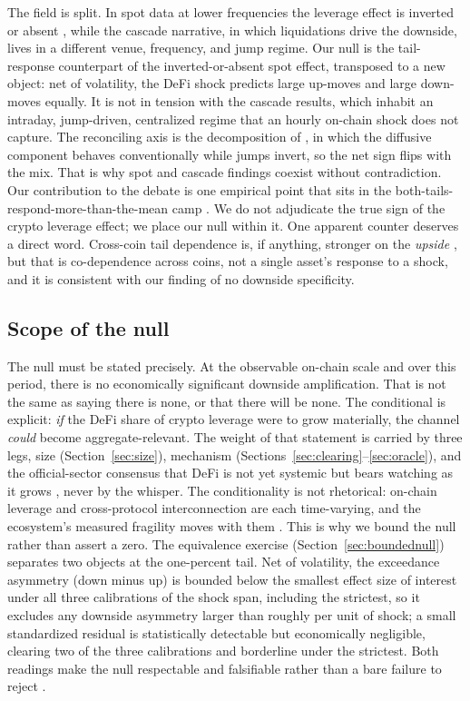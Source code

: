 The field is split. In spot data at lower frequencies the leverage effect
is inverted or absent \citep{baur2018,aharon2023}, while the cascade
narrative, in which liquidations drive the downside, lives in a different
venue, frequency, and jump regime. Our null is the tail-response counterpart
of the inverted-or-absent spot effect, transposed to a new object: net of
volatility, the DeFi shock predicts large up-moves and large down-moves
equally. It is not in tension with the cascade results, which inhabit an
intraday, jump-driven, centralized regime that an hourly on-chain shock does
not capture. The reconciling axis is the decomposition of \citet{huang2022},
in which the diffusive component behaves conventionally while jumps invert, so
the net sign flips with the mix. That is why spot and cascade findings coexist
without contradiction. Our contribution to the debate is one empirical
point that sits in the both-tails-respond-more-than-the-mean camp
\citep{ando2022}. We do not adjudicate the true sign of the crypto leverage
effect; we place our null within it. One apparent counter deserves a direct
word. Cross-coin tail dependence is, if anything, stronger on the
\emph{upside} \citep{nguyen2020}, but that is co-dependence across coins, not
a single asset's response to a shock, and it is consistent with our finding of
no downside specificity.

\subsection{Scope of the null}
\label{sec:caution}

The null must be stated precisely. At the observable on-chain scale and over
this period, there is no economically significant downside amplification. That
is not the same as saying there is none, or that there will be none. The
conditional is explicit: \emph{if} the DeFi share of crypto leverage were to
grow materially, the channel \emph{could} become aggregate-relevant. The
weight of that statement is carried by three legs, size
(Section~\ref{sec:size}), mechanism
(Sections~\ref{sec:clearing}--\ref{sec:oracle}), and the official-sector
consensus that DeFi is not yet systemic but bears watching as it grows
\citep{fsb2023,aramonte2021,imf2021,ecb2022}, never by the whisper. The
conditionality is not rhetorical: on-chain leverage \citep{heimbach2024} and
cross-protocol interconnection \citep{badev2023} are each time-varying, and
the ecosystem's measured fragility moves with them \citep{bertomeu2024}. This is why we bound the null
rather than assert a zero. The equivalence exercise
(Section~\ref{sec:boundednull}) separates two objects at the one-percent tail. Net of
volatility, the exceedance asymmetry (down minus up) is bounded below the smallest
effect size of interest under all three calibrations of the shock span, including the
strictest, so it excludes any downside asymmetry larger than roughly \MdeEightyExc{}
per unit of shock; a small standardized residual is statistically detectable but
economically negligible, clearing two of the three calibrations and borderline under
the strictest. Both readings make the null respectable and falsifiable rather than a
bare failure to reject \citep{altman1995,ioannidis2017}.

